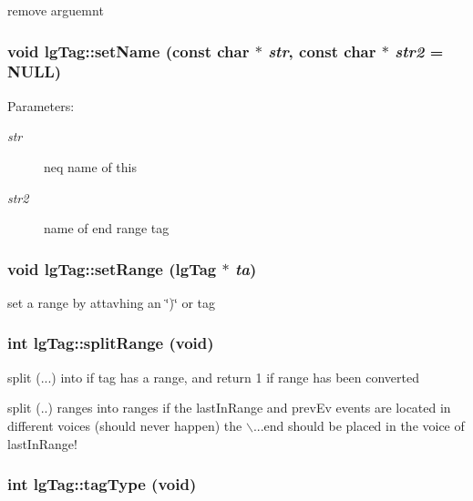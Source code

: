 remove arguemnt 

\subsubsection{\setlength{\rightskip}{0pt plus 5cm}void lg\-Tag::set\-Name (const char $\ast$ {\em str}, const char $\ast$ {\em str2} = NULL)\hspace{0.3cm}{\tt  [inline]}}\label{classlgTag_a7}


\begin{Desc}
\item[Parameters: ]\par
\begin{description}
\item[{\em 
str}]neq name of this \item[{\em 
str2}]name of end range tag \end{description}
\end{Desc}
\subsubsection{\setlength{\rightskip}{0pt plus 5cm}void lg\-Tag::set\-Range ({\bf lg\-Tag} $\ast$ {\em ta})}\label{classlgTag_a20}


set a range by attavhing an \char`\"{})\char`\"{} or  tag 

\subsubsection{\setlength{\rightskip}{0pt plus 5cm}int lg\-Tag::split\-Range (void)}\label{classlgTag_a24}


split (...) into   if tag has a range, and return 1 if range has been converted 

split (..) ranges into   ranges if the last\-In\-Range and prev\-Ev events are located in different voices (should never happen) the $\backslash$...end should be placed in the voice of last\-In\-Range! 
\subsubsection{\setlength{\rightskip}{0pt plus 5cm}int lg\-Tag::tag\-Type (void)}\label{classlgTag_a0}


